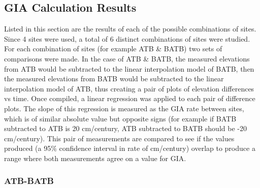 \subsection{GIA Calculation Results}



 Listed in this section are the results of each of the possible combinations of sites.
 Since 4 sites were used, a total of 6 distinct combinations of sites were studied.
 For each combination of sites (for example ATB \& BATB) two sets of comparisons
 were made. In the case of ATB \& BATB, the measured elevations from ATB would be
 subtracted to the linear interpolation model of BATB, then the measured elevations
 from BATB would be subtracted to the linear interpolation model of ATB, thus
 creating a pair of plots of elevation differences vs time. Once compiled, a linear
 regression was applied to each pair of difference plots. The slope of
 this regression is measured as the GIA rate between sites, which is of
 similar absolute value but opposite signs (for example if BATB subtracted
 to ATB is 20 cm/century, ATB subtracted to BATB should be -20 cm/century).
 This pair of measurements are compared to see if the values produced (a
 95\% confidence interval in rate of cm/century) overlap to produce a
 range where both measurements agree on a value for GIA.


\subsubsection{ATB-BATB}

